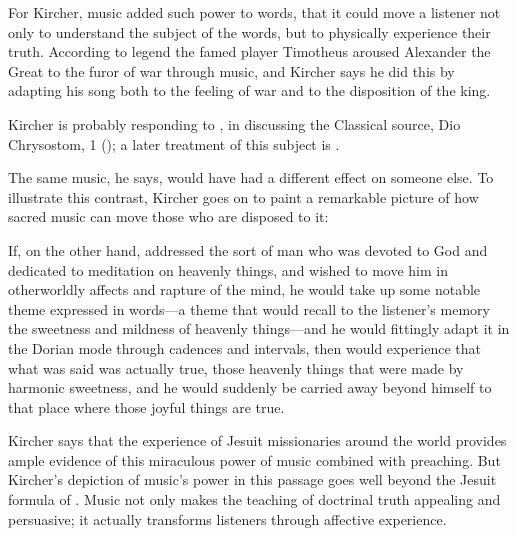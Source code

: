 For Kircher, music added such power to words, that it could move a listener not
only to understand the subject of the words, but to physically experience their
truth.
According to legend the famed  player Timotheus aroused Alexander
the Great to the furor of war through music, and Kircher says he did this by
adapting his song both to the feeling of war and to the disposition of the
king.%
\begin{Footnote}
    Kircher is probably responding to \autocite[90]{Galilei:Dialogo}, in
    discussing the Classical source, Dio Chrysostom,  1
    (); a later treatment of this subject is
    \autocite{Dryden:Alexander}.
\end{Footnote}
The same music, he says, would have had a different effect on someone else.
To illustrate this contrast, Kircher goes on to paint a remarkable picture of
how sacred music can move those who are disposed to it:
\begin{quoting}
    If, on the other hand,  addressed the sort of man who was
    devoted to God and dedicated to meditation on heavenly things, and wished to
    move him in otherworldly affects and rapture of the mind, he would take up
    some notable theme expressed in words---a theme that would recall to the
    listener's memory the sweetness and mildness of heavenly things---and he
    would fittingly adapt it in the Dorian mode through cadences and intervals,
    then  would experience that what was said was actually
    true, those heavenly things that were made by harmonic sweetness, and he
    would suddenly be carried away beyond himself to that place where those
    joyful things are true.%
        \Autocite[, . 
        The Latin is difficult enough to merit a full citation: 
        {Sicuti contra, si quis Deo deuotum hominum rerumque coelestium,
        meditationi deditum in exoticos affectus raptusque mentis commouere
        vellet is supra insigne aliquod verborum thema, quod rerum caelestium
        dulcedinem, \et{} suauitatem auditori in memoriam reuocaret, modulo
        dorio per clausulas interuallaque aptè adaptet, \et{} experietur quod
        dixi verum esse, statim extra se factos dulcedine harmonica eò, vbi vera
        sunt gaudi rapi: vidi ego nonsemel in viris ordinis nostri sanctitate
        illustribus huiusmodi experimenta}.] 
        {Kircher:Musurgia}
\end{quoting}
Kircher says that the experience of Jesuit missionaries around the world
provides ample evidence of this miraculous power of music combined with
preaching.
But Kircher's depiction of music's power in this passage goes well beyond the
Jesuit formula of .%
    \Autocite
    [On the Jesuit approach to religious arts, see] 
    [35--51]{Bailey:Art}
Music not only makes the teaching of doctrinal truth appealing and persuasive;
it actually transforms listeners through affective experience.

